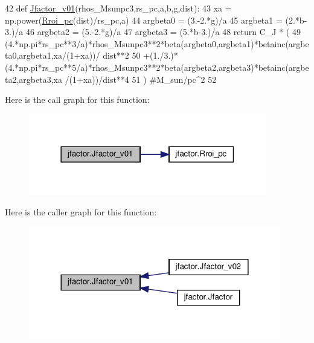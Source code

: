 \begin{DoxyCode}
42 \textcolor{keyword}{def }\hyperlink{namespacejfactor_aeb50ca469052983461a3e8382cfb4f95}{Jfactor\_v01}(rhos\_Msunpc3,rs\_pc,a,b,g,dist):
43     xa = np.power(\hyperlink{namespacejfactor_ae5aad7f2ac90b82740c027677d7f4ac7}{Rroi\_pc}(dist)/rs\_pc,a)
44     argbeta0 = (3.-2.*g)/a
45     argbeta1 = (2.*b-3.)/a
46     argbeta2 = (5.-2.*g)/a
47     argbeta3 = (5.*b-3.)/a
48     \textcolor{keywordflow}{return} C\_J * (
49         (4.*np.pi*rs\_pc**3/a)*rhos\_Msunpc3**2*beta(argbeta0,argbeta1)*betainc(argbeta0,argbeta1,xa/(1+xa))/
      dist**2
50         +(1./3.)*(4.*np.pi*rs\_pc**5/a)*rhos\_Msunpc3**2*beta(argbeta2,argbeta3)*betainc(argbeta2,argbeta3,xa
      /(1+xa))/dist**4
51         ) \textcolor{comment}{#M\_sun/pc^2}
52 
\end{DoxyCode}
Here is the call graph for this function\+:\nopagebreak
\begin{figure}[H]
\begin{center}
\leavevmode
\includegraphics[width=294pt]{de/d47/namespacejfactor_aeb50ca469052983461a3e8382cfb4f95_cgraph}
\end{center}
\end{figure}
Here is the caller graph for this function\+:\nopagebreak
\begin{figure}[H]
\begin{center}
\leavevmode
\includegraphics[width=312pt]{de/d47/namespacejfactor_aeb50ca469052983461a3e8382cfb4f95_icgraph}
\end{center}
\end{figure}
\mbox{\label{namespacejfactor_afd0f5558d89189557900a6a1503261b3}} 
